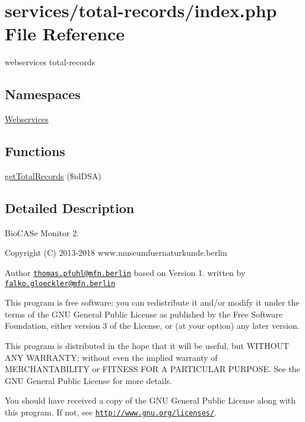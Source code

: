 \hypertarget{services_2total-records_2index_8php}{}\section{services/total-\/records/index.php File Reference}
\label{services_2total-records_2index_8php}


webservices total-\/records  


\subsection*{Namespaces}
\begin{DoxyCompactItemize}
\item 
 \hyperlink{namespace_webservices}{Webservices}
\end{DoxyCompactItemize}
\subsection*{Functions}
\begin{DoxyCompactItemize}
\item 
\hyperlink{namespace_webservices_ac8ab1673965ee4402764681d199621d2}{get\+Total\+Records} (\$id\+D\+SA)
\end{DoxyCompactItemize}


\subsection{Detailed Description}
Bio\+C\+A\+Se Monitor 2. \begin{DoxyCopyright}{Copyright}
(C) 2013-\/2018 www.\+museumfuernaturkunde.\+berlin 
\end{DoxyCopyright}
\begin{DoxyAuthor}{Author}
\href{mailto:thomas.pfuhl@mfn.berlin}{\tt thomas.\+pfuhl@mfn.\+berlin} based on Version 1. written by \href{mailto:falko.gloeckler@mfn.berlin}{\tt falko.\+gloeckler@mfn.\+berlin}
\end{DoxyAuthor}
This program is free software\+: you can redistribute it and/or modify it under the terms of the G\+NU General Public License as published by the Free Software Foundation, either version 3 of the License, or (at your option) any later version.

This program is distributed in the hope that it will be useful, but W\+I\+T\+H\+O\+UT A\+NY W\+A\+R\+R\+A\+N\+TY; without even the implied warranty of M\+E\+R\+C\+H\+A\+N\+T\+A\+B\+I\+L\+I\+TY or F\+I\+T\+N\+E\+SS F\+OR A P\+A\+R\+T\+I\+C\+U\+L\+AR P\+U\+R\+P\+O\+SE. See the G\+NU General Public License for more details.

You should have received a copy of the G\+NU General Public License along with this program. If not, see \href{http://www.gnu.org/licenses/}{\tt http\+://www.\+gnu.\+org/licenses/}. 